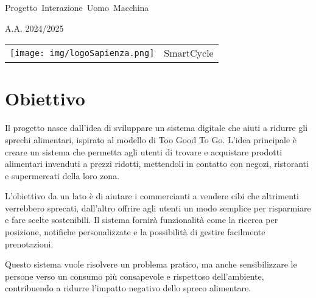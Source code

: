 \documentclass{article}
\author{Alessandro Dori}
\date{\today}
\begin{document}
\hbox{\Huge Progetto Interazione Uomo Macchina}
\begin{center}
    \Huge A.A. 2024/2025
\end{center}

\begin{center}
    \begin{tabular}{c c}
        \texttt{[image: img/logoSapienza.png]} & \huge SmartCycle \\
    \end{tabular}
\end{center}

\section*{Obiettivo}
Il progetto nasce dall'idea di sviluppare un sistema digitale che aiuti a ridurre gli sprechi alimentari, ispirato al modello di Too Good To Go. 
L’idea principale è creare un sistema che permetta agli utenti di trovare e acquistare prodotti alimentari invenduti a prezzi ridotti, mettendoli in contatto con negozi, ristoranti e supermercati della loro zona.

L’obiettivo da un lato è di aiutare i commercianti a vendere cibi che altrimenti verrebbero sprecati, dall’altro offrire agli utenti un modo semplice per risparmiare e fare scelte sostenibili. 
Il sistema fornirà funzionalità come la ricerca per posizione, notifiche personalizzate e la possibilità di gestire facilmente prenotazioni.

Questo sistema vuole risolvere un problema pratico, ma anche sensibilizzare le persone verso un consumo più consapevole e rispettoso dell’ambiente, contribuendo a ridurre l’impatto negativo dello spreco alimentare.
\end{document}

